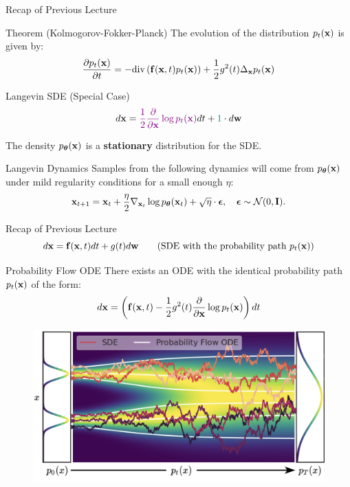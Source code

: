 \documentclass{beamer}
\begin{document}
\begin{frame}{Recap of Previous Lecture}
 	\begin{block}{Theorem (Kolmogorov-Fokker-Planck)}
 		The evolution of the distribution $p_t(\mathbf{x})$ is given by:
 		\vspace{-0.3cm}
 		\[
 			\frac{\partial p_t(\mathbf{x})}{\partial t} = - \text{div}\left(\mathbf{f}(\mathbf{x}, t) p_t(\mathbf{x})\right) + \frac{1}{2}g^2(t) \Delta_{\mathbf{x}}p_t(\mathbf{x})
 		\]
 		\vspace{-0.5cm}
 	\end{block}
 	\begin{block}{Langevin SDE (Special Case)}
 		\vspace{-0.3cm}
 		\[
 			d \mathbf{x} = {\color{violet}\frac{1}{2} \frac{\partial}{\partial \mathbf{x}} \log p_t(\mathbf{x})} d t + {\color{teal} 1 } \cdot d \mathbf{w}
 		\]
 		\vspace{-0.3cm}
 	\end{block}
 	The density $p_{\boldsymbol{\theta}}(\mathbf{x})$ is a \textbf{stationary} distribution for the SDE.
	\begin{block}{Langevin Dynamics}
		Samples from the following dynamics will come from $p_{\boldsymbol{\theta}}(\mathbf{x})$ under mild regularity conditions for a small enough $\eta$:
		\vspace{-0.2cm}
		\[
			\mathbf{x}_{t + 1} = \mathbf{x}_t + \frac{\eta}{2} \nabla_{\mathbf{x}_t} \log p_{\boldsymbol{\theta}}(\mathbf{x}_t) + \sqrt{\eta} \cdot \boldsymbol{\epsilon}, \quad \boldsymbol{\epsilon} \sim \mathcal{N}(0, \mathbf{I}).
		\]
	\end{block}
\end{frame}
\begin{frame}{Recap of Previous Lecture}
	\vspace{-0.3cm}
	\[
		d\mathbf{x} = \mathbf{f}(\mathbf{x}, t) dt + g(t) d \mathbf{w} \qquad \text{(SDE with the probability path $p_t(\mathbf{x})$)}
	\]
	\vspace{-0.7cm}
	\begin{block}{Probability Flow ODE}
		There exists an ODE with the identical probability path $p_t(\mathbf{x})$ of the form:
		\vspace{-0.3cm}
		\[
			d\mathbf{x} = \left(\mathbf{f}(\mathbf{x}, t) -\frac{1}{2} g^2(t) \frac{\partial}{\partial \mathbf{x}} \log p_t(\mathbf{x}) \right) dt
		\]
		\vspace{-0.7cm}
	\end{block}
	\begin{figure}
		\includegraphics[width=0.75\linewidth]{figs/probability_flow}
	\end{figure}
\end{frame}
\end{document}
